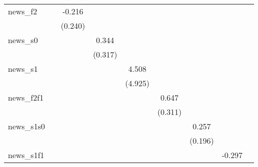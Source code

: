 {\begin{tabular}{l*{8}{c}}
\addlinespace
news\_f2     &                     &      -0.216         &                     &                     &                     &                     &                     &                     \\
            &                     &     (0.240)         &                     &                     &                     &                     &                     &                     \\
\addlinespace
news\_s0     &                     &                     &       0.344         &                     &                     &                     &                     &                     \\
            &                     &                     &     (0.317)         &                     &                     &                     &                     &                     \\
\addlinespace
news\_s1     &                     &                     &                     &       4.508         &                     &                     &                     &                     \\
            &                     &                     &                     &     (4.925)         &                     &                     &                     &                     \\
\addlinespace
news\_f2f1   &                     &                     &                     &                     &       0.647\sym{**} &                     &                     &                     \\
            &                     &                     &                     &                     &     (0.311)         &                     &                     &                     \\
\addlinespace
news\_s1s0   &                     &                     &                     &                     &                     &       0.257         &                     &                     \\
            &                     &                     &                     &                     &                     &     (0.196)         &                     &                     \\
\addlinespace
news\_s1f1   &                     &                     &                     &                     &                     &                     &      -0.297         &                     \\

\end{tabular}}
